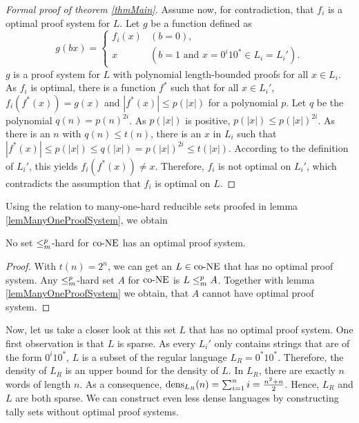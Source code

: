 \begin{proof}[Formal proof of theorem \ref{thmMain}]
    Assume now, for contradiction, that \(f_i\) is a optimal proof system for \(L\). Let \(g\) be a function defined as
      \[ g(bx) = \begin{cases}
                  f_i(x) & (b = 0), \\
                  x & (b = 1 \text{ and } x = 0^i10^* \in L_i = L_i').
                 \end{cases} \]
    \(g\) is a proof system for \(L\) with polynomial length-bounded proofs for all \(x \in L_i\). As \(f_i\) is optimal, there is a function \(f^*\) such that for all \(x \in L_i'\), \(f_i(f^*(x)) = g(x)\) and \(|f^*(x)| \leq p(|x|)\) for a polynomial \(p\). Let \(q\) be the polynomial \(q(n) = p(n)^{2i}\). As \(p(|x|)\) is positive, \(p(|x|) \leq p(|x|)^{2i}\). As there is an \(n\) with \(q(n) \leq t(n)\), there is an \(x\) in \(L_i\) such that \(|f^*(x)| \leq p(|x|) \leq q(|x|) = p(|x|)^{2i} \leq t(|x|)\). According to the definition of \(L_i'\), this yields \(f_i(f^*(x)) \neq x\). Therefore, \(f_i\) is not optimal on \(L_i'\), which contradicts the assumption that \(f_i\) is optimal on \(L\).
  \end{proof}

  Using the relation to many-one-hard reducible sets proofed in lemma \ref{lemManyOneProofSystem}, we obtain

  \begin{corollary} \label{corHardSets}
    No set \(\leq_{m}^{p}\)-hard for \(\text{co-NE}\) has an optimal proof system.
  \end{corollary}

  \begin{proof}
    With \(t(n) = 2^n\), we can get an \(L \in \text{co-NE}\) that has no optimal proof system. Any \(\leq_{m}^{p}\)-hard set \(A\) for \(\text{co-NE}\) is \(L \leq_{m}^{p} A\). Together with lemma \ref{lemManyOneProofSystem} we obtain, that \(A\) cannot have optimal proof system.
  \end{proof}

  Now, let us take a closer look at this set \(L\) that has no optimal proof system. One first observation is that \(L\) is sparse. As every \(L_i'\) only contains strings that are of the form \(0^i10^*\), \(L\) is a subset of the regular language \(L_R = 0^*10^*\). Therefore, the density of \(L_R\) is an upper bound for the density of \(L\). In \(L_R\), there are exactly \(n\) words of length \(n\). As a consequence, \(\operatorname{dens}_{L_R}(n) = \sum_{i=1}^n i = \frac{n^2 + n}{2}\). Hence, \(L_R\) and \(L\) are both sparse. We can construct even less dense languages by constructing tally sets without optimal proof systems.

